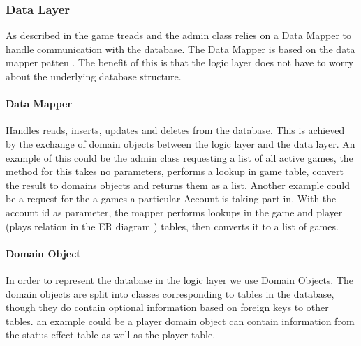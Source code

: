 \subsubsection{Data Layer}
\label{chap:dbImplementation}
As described in  the game treads and the admin class relies on a Data Mapper to handle communication with the database. The Data Mapper is based on the data mapper patten . The benefit of this is that the logic layer does not have to worry about the underlying database structure.
 
\paragraph{Data Mapper}
Handles reads, inserts, updates and deletes from the database. This is achieved by the exchange of domain objects between the logic layer and the data layer.
An example of this could be the admin class requesting a list of all active games, the method for this takes no parameters, performs a lookup in game table, convert the result to domains objects and returns them as a list.
Another example could be a request for the a games a particular Account is taking part in. With the account id as parameter, the mapper performs lookups in the game and player (plays relation in the ER diagram ) tables, then converts it to a list of games.


\paragraph{Domain Object} 
In order to represent the database in the logic layer we use Domain Objects. The domain objects are split into classes corresponding to tables in the database, though they do contain optional information based on foreign keys to other tables. an example could be a player domain object can contain information from the status effect table as well as the player table.
